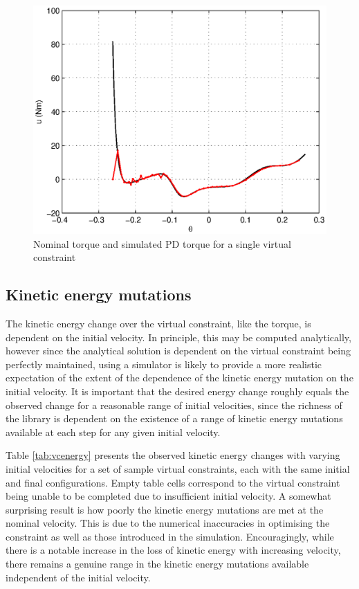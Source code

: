 \begin{figure}
\centering
\includegraphics[width=0.8\linewidth]{7Results/pdmatchesnom}
\caption{Nominal torque and simulated PD torque for a single virtual constraint}
\label{fig:pdmatchesnom}
\end{figure}


\subsection{Kinetic energy mutations} \label{sec:reskineng}
The kinetic energy change over the virtual constraint, like the torque, is dependent on the initial velocity. In principle, this may be computed analytically, however since the analytical solution is dependent on the virtual constraint being perfectly maintained, using a simulator is likely to provide a more realistic expectation of the extent of the dependence of the kinetic energy mutation on the initial velocity. It is important that the desired energy change roughly equals the observed change for a reasonable range of initial velocities, since the richness of the library is dependent on the existence of a range of kinetic energy mutations available at each step for any given initial velocity.

Table \ref{tab:vcenergy} presents the observed kinetic energy changes with varying initial velocities for a set of sample virtual constraints, each with the same initial and final configurations. Empty table cells correspond to the virtual constraint being unable to be completed due to insufficient initial velocity. A somewhat surprising result is how poorly the kinetic energy mutations are met at the nominal velocity. This is due to the numerical inaccuracies in optimising the constraint as well as those introduced in the simulation. Encouragingly, while there is a notable increase in the loss of kinetic energy with increasing velocity, there remains a genuine range in the kinetic energy mutations available independent of the initial velocity.

